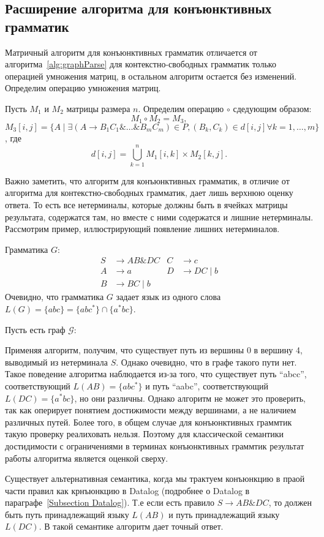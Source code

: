 \subsection{Расширение алгоритма для конъюнктивных грамматик}

Матричный алгоритм для конъюнктивных грамматик отличается от алгоритма~\ref{alg:graphParse} для контекстно-свободных грамматик только операцией умножения матриц, в остальном алгоритм остается без изменений. Определим операцию умножения матриц.
\begin{definition}
    Пусть $M_1$ и $M_2$ матрицы размера $n$. Определим операцию $\circ$  сдедующим образом:
     $$M_1 \circ M_2 = M_3,$$ $$M_3 [i,j] = \{A \mid \exists (A \rightarrow B_1 C_1 \& \ldots \& B_m C_m) \in P, (B_k , C_k) \in d[i,j] \forall k = 1,\ldots,m\}$$, где $$d[i,j] = \bigcup_{k = 1}^{n} M_1 [i,k] \times M_2 [k,j].$$
\end{definition}

Важно заметить, что алгоритм для конъюнктивных грамматик, в отличие от алгоритма для контекстно-свободных грамматик, дает лишь верхнюю оценку ответа. То есть все нетерминалы, которые должны быть в ячейках матрицы результата, содержатся там, но вместе с ними содержатся и лишние нетерминалы. Рассмотрим пример, иллюстрирующий появление лишних нетерминалов.

\begin{example}
    Грамматика $G$:
    \begin{align*}
    S &\to AB \& DC & C &\to c \\
    A &\to a        & D &\to DC \mid b\\
    B &\to BC \mid b
    \end{align*}
    Очевидно, что грамматика $G$ задает язык из одного слова $L(G) = \{abc\} = \{abc^*\} \cap \{a^* bc\}$.

    Пусть есть граф $\mathcal{G}$:
    \begin{center}
      
    \end{center}
    Применяя алгоритм, получим, что существует путь из вершины 0 в вершину 4, выводимый из нетерминала $S$. Однако очевидно, что в графе такого пути нет.
    Такое поведение алгоритма наблюдается из-за того, что существует путь ``abcc'', соответствующий $L(AB) = \{abc^*\}$ и путь ``aabc'', соответствующий $L(DC) = \{a^{*}bc\}$, но они различны. Однако алгоритм не может это проверить, так как оперирует понятием достижимости между вершинами, а не наличием различных путей. Более того, в общем случае для конъюнктивных граммтик такую проверку реалиховать нельзя. Поэтому для классической семантики достидимости с ограничениями в терминах конъюнктивных граммтик результат работы алгоритма является оценкой сверху.

    Существует альтернативная семантика, когда мы трактуем конъюнкцию в праой части правил как крнъюнкцию в Datalog (подробнее о Datalog в параграфе~\ref{Subsection Datalog}). Т.е если есть правило $S \to AB \& DC$, то должен быть путь принадлежащий языку $L(AB)$ и путь принадлежащий языку $L(DC)$. В такой семантике алгоритм дает точный ответ.
\end{example}

